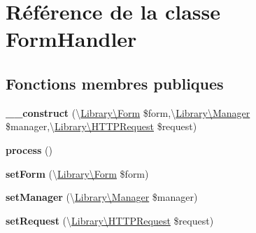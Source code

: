 \hypertarget{class_library_1_1_form_handler}{\section{Référence de la classe Form\+Handler}
\label{class_library_1_1_form_handler}
}
\subsection*{Fonctions membres publiques}
\begin{DoxyCompactItemize}
\item 
\hypertarget{class_library_1_1_form_handler_a922c4f02b1eb1293ffab92aee01507a1}{{\bfseries \+\_\+\+\_\+construct} (\textbackslash{}\hyperlink{class_library_1_1_form}{Library\textbackslash{}\+Form} \$form,\textbackslash{}\hyperlink{class_library_1_1_manager}{Library\textbackslash{}\+Manager} \$manager,\textbackslash{}\hyperlink{class_library_1_1_h_t_t_p_request}{Library\textbackslash{}\+H\+T\+T\+P\+Request} \$request)}\label{class_library_1_1_form_handler_a922c4f02b1eb1293ffab92aee01507a1}

\item 
\hypertarget{class_library_1_1_form_handler_a7d4ad4038b036a67eece619e6f88c89e}{{\bfseries process} ()}\label{class_library_1_1_form_handler_a7d4ad4038b036a67eece619e6f88c89e}

\item 
\hypertarget{class_library_1_1_form_handler_ab13cf38f296f2d3d0ec4bb17b4c7eb88}{{\bfseries set\+Form} (\textbackslash{}\hyperlink{class_library_1_1_form}{Library\textbackslash{}\+Form} \$form)}\label{class_library_1_1_form_handler_ab13cf38f296f2d3d0ec4bb17b4c7eb88}

\item 
\hypertarget{class_library_1_1_form_handler_ae3feb3d6f061dc6174ca86cc8bf0a394}{{\bfseries set\+Manager} (\textbackslash{}\hyperlink{class_library_1_1_manager}{Library\textbackslash{}\+Manager} \$manager)}\label{class_library_1_1_form_handler_ae3feb3d6f061dc6174ca86cc8bf0a394}

\item 
\hypertarget{class_library_1_1_form_handler_a1150ba9f3d54da8609c040e7a64bf7a8}{{\bfseries set\+Request} (\textbackslash{}\hyperlink{class_library_1_1_h_t_t_p_request}{Library\textbackslash{}\+H\+T\+T\+P\+Request} \$request)}\label{class_library_1_1_form_handler_a1150ba9f3d54da8609c040e7a64bf7a8}

\end{DoxyCompactItemize}
